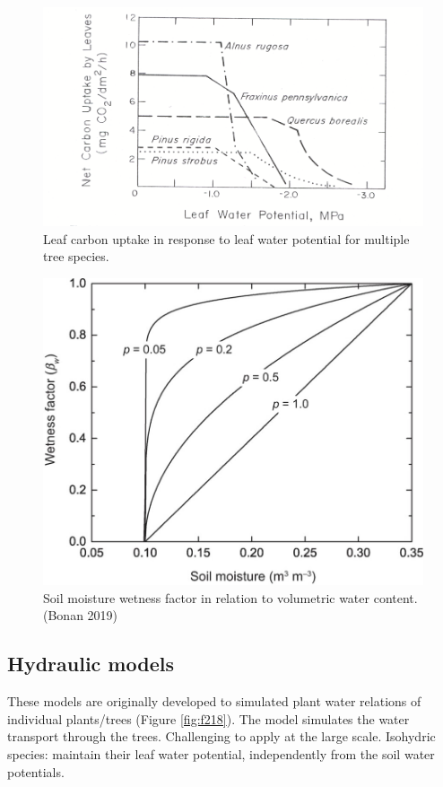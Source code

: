 \documentclass[12pt,oneside]{book}
\begin{document}
\begin{figure}

{\centering \includegraphics[width=0.8\linewidth]{figures/chap2/leafWP} 

}

\caption{Leaf carbon uptake in response to leaf water potential for multiple tree species.}\label{fig:f216}
\end{figure}

\begin{figure}

{\centering \includegraphics[width=0.8\linewidth]{figures/chap2/SWfactor} 

}

\caption{Soil moisture wetness factor in relation to volumetric water content. (Bonan 2019)}\label{fig:f217}
\end{figure}

\subsection{Hydraulic models}\label{hydraulic-models}

These models are originally developed to simulated plant water relations
of individual plants/trees (Figure \ref{fig:f218}). The model simulates
the water transport through the trees. Challenging to apply at the large
scale. Isohydric species: maintain their leaf water potential,
independently from the soil water potentials.
\end{document}

